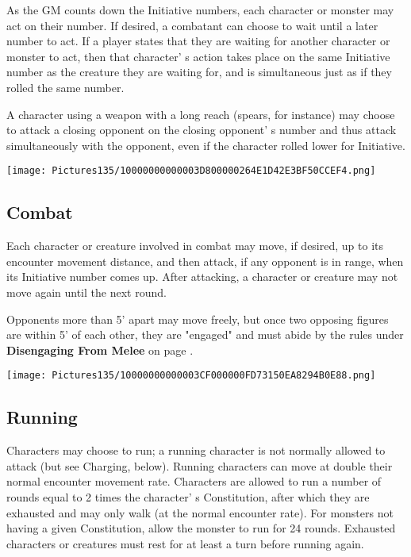 \documentclass[a4paper,twoside,openany,10pt]{book}
\begin{document}
\begin{multicols}{2}
As the GM counts down the Initiative numbers, each character or monster may act on their number. If desired, a combatant can choose to wait until a later number to act. If a player states that they are waiting for another character or monster to act, then that character' s action takes place on the same Initiative number as the creature they are waiting for, and is simultaneous just as if they rolled the same number.

A character using a weapon with a long reach (spears, for instance) may choose to attack a closing opponent on the closing opponent' s number and thus attack simultaneously with the opponent, even if the character rolled lower for Initiative.

\begin{flushleft}
	\texttt{[image: Pictures135/10000000000003D800000264E1D42E3BF50CCEF4.png]}
\end{flushleft}

\subsection{Combat}\label{combat}

Each character or creature involved in combat may move, if desired, up to its encounter movement distance, and then attack, if any opponent is in range, when its Initiative number comes up. After attacking, a character or creature may not move again until the next round.

Opponents more than 5' apart may move freely, but once
two opposing figures are within 5' of each other, they
are "engaged" and must abide by the rules under \textbf{Disengaging From
Melee }on page \hyperlink{disengaging-from-melee}{\pageref{disengaging-from-melee}}.

\begin{flushleft}
	\texttt{[image: Pictures135/10000000000003CF000000FD73150EA8294B0E88.png]}
\end{flushleft}

\subsection{Running}\label{running}

Characters may choose to run; a running character is not normally allowed to attack (but see Charging, below). Running characters can move at double their normal encounter movement rate. Characters are allowed to run a number of rounds equal to 2 times the character' s Constitution, after which they are exhausted and may only walk (at the normal encounter rate). For monsters not having a given Constitution, allow the monster to run for 24 rounds. Exhausted characters or creatures must rest for at least a turn before running again.


\end{multicols}
\end{document}
